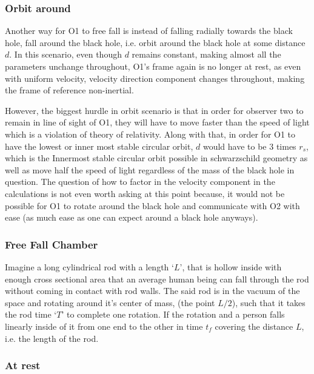 \subsubsection{Orbit around}\label{subsubsec:orbit_ff}

Another way for O1 to free fall is instead of falling radially towards the black hole, fall around the black hole, i.e. orbit around the black hole at some distance \(d\). 
In this scenario, even though \(d\) remains constant, making almost all the parameters unchange throughout, O1's frame again is no longer at rest, as even with uniform velocity, 
velocity direction component changes throughout, making the frame of reference non-inertial. 

However, the biggest hurdle in orbit scenario is that in order for observer two to remain in line of sight of O1, they will have to move faster than the speed of light which is a violation of
theory of relativity. Along with that, in order for O1 to have the lowest or inner most stable circular orbit, \(d\) would have to be \(3\) times \(r_s\), which is the Innermost stable circular orbit 
possible in schwarzschild geometry as well as move half the speed of light regardless of the mass of the black hole in question. The question of how to factor in the 
velocity component in the calculations is not even worth asking at this point because, it would not be possible for O1 to rotate around the black hole and communicate with O2 
with ease (as much ease as one can expect around a black hole anyways).

\subsubsection{Free Fall Chamber}\label{subsubsec:ff_cham}

Imagine a long cylindrical rod with a length `\(L\)', that is hollow inside with enough cross sectional area that an average human being can fall through the 
rod without coming in contact with rod walls. The said rod is in the vacuum of the space and rotating around it's center of mass, (the point \(L/2\)), such 
that it takes the rod time `\(T\)' to complete one rotation. If the rotation and a person falls linearly inside of it from one end to the other in time \(t_f\) covering 
the distance \(L\), i.e. the length of the rod. 

\subsubsection{At rest}\label{subsubsec:rest}

